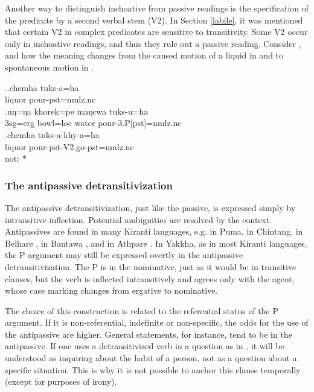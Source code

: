 Another way to distinguish inchoative from passive readings is the specification of the predicate by a second verbal stem (V2). In Section \ref{labile}, it was mentioned that certain V2 in complex predicates are sensitive to transitivity. Some V2 occur only in inchoative readings, and thus they rule out a  passive reading. Consider \Next, and how the meaning changes from the caused motion of a liquid in \Next[a] and \Next[b] to spontaneous motion in \Next[c].

\ex.\ag.chemha tuks-a=ha\\
liquor pour{\sc [3sg]-pst=nmlz.nc} \\
\bg.uŋ=ŋa khorek=pe maŋcwa tuks-u=ha\\
{\sc 3sg=erg} bowl{\sc =loc} water pour{\sc -3.P[pst]=nmlz.nc}\\
\bg.chemha tuks-a-khy-a=ha\\
liquor pour{\sc [3sg]-pst-V2.go-pst=nmlz.nc} \\
 not: *


\subsubsection{The antipassive detransitivization}\label{detr-antip}

The antipassive detransitivization, just like the passive, is expressed simply by intransitive inflection. Potential ambiguities are  resolved by the context. Antipassives are  found in many Kiranti languages, e.g. in Puma, in Chintang, in Belhare \citep{Bickel2011Detrans, Schikowski2013_Thesis}, in Bantawa \citep[221ff.]{Doornenbal2009A-grammar}, and in Athpare \citep[122]{Ebert1997A-grammar}. In Yakkha, as in most Kiranti languages, the P argument may still be expressed overtly in the antipassive detransitivization. The P is in the nominative, just as it would be in transitive clauses, but the verb is inflected intransitively and agrees only with the agent, whose case marking changes from ergative to nominative.

The choice of this construction is related to the referential status of the P argument. If it is non-referential, indefinite or non-specific, the odds for the use of the antipassive are higher. General statements, for instance,  tend to be in the antipassive. If one uses a detransitivized verb in a question as in \Next, it will be understood as inquiring about the habit of a person, not as a question about a specific situation. This is why it is not possible to anchor this clause temporally (except for purposes of irony). 

